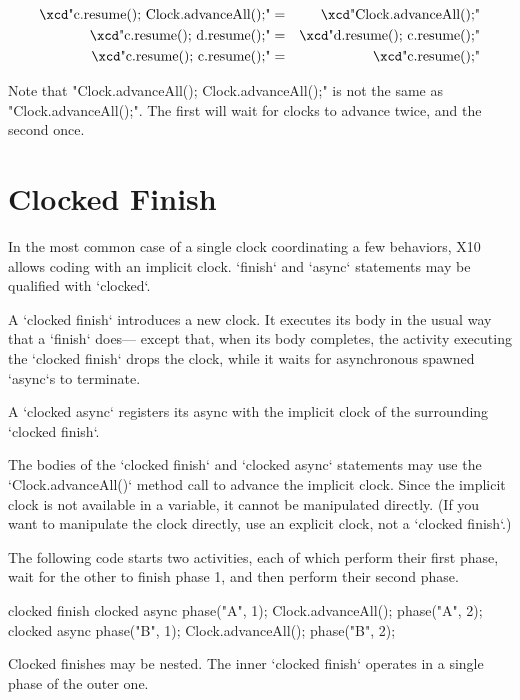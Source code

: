 {\small
\begin{eqnarray}
 \mbox{\xcd"c.resume(); Clock.advanceAll();"}       &=& \mbox{\xcd"Clock.advanceAll();"}\\
 \mbox{\xcd"c.resume(); d.resume();"} &=& \mbox{\xcd"d.resume(); c.resume();"}\\
 \mbox{\xcd"c.resume(); c.resume();"} &=& \mbox{\xcd"c.resume();"}
\end{eqnarray}
}

Note that \xcd"Clock.advanceAll(); Clock.advanceAll();" is not the same as \xcd"Clock.advanceAll();". The
first will wait for clocks to advance twice, and the second
once.  


\section{Clocked Finish}
\label{ClockedFinish}

In the most common case of a single clock coordinating a few behaviors, X10
allows coding with an implicit clock.  \xcd`finish` and \xcd`async` statements
may be qualified with \xcd`clocked`.  

A \xcd`clocked finish` introduces a new clock.  It executes its body in the
usual way that a \xcd`finish` does--- except that, when its body completes,
the activity executing the \xcd`clocked finish` drops the clock, while it
waits for asynchronous spawned \xcd`async`s to terminate.  

A \xcd`clocked async` registers its async with the implicit clock of
the surrounding \xcd`clocked finish`.   

The bodies of the \xcd`clocked finish` and \xcd`clocked async`
statements  may use the
\xcd`Clock.advanceAll()` 
method call to advance the implicit clock.  Since the implicit clock is not
available in a variable, it cannot be manipulated directly. (If you want to
manipulate the clock directly, use an explicit clock, not a \xcd`clocked finish`.)

\begin{ex}
The following code starts two activities, each of which perform their first
phase, wait for the other to finish phase 1, and then perform their second
phase.  
\begin{xten}
clocked finish {
  clocked async {
     phase("A", 1);
     Clock.advanceAll();
     phase("A", 2);
  }
  clocked async {
     phase("B", 1);
     Clock.advanceAll();
     phase("B", 2);
  }
}
\end{xten}
\end{ex}


Clocked finishes may be nested.  The inner \xcd`clocked finish` operates in a
single phase of the outer one.  
